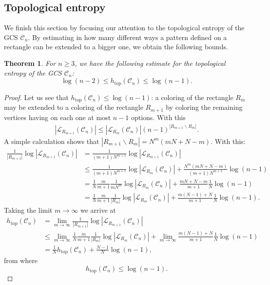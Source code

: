 \documentclass{aims}
\def\htop{h_{\mathrm{top}}}
\newtheorem{theorem}{Theorem}[section]
\theoremstyle{definition}
\begin{document}

\subsection{Topological entropy}
We finish this section by focusing our attention to the topological entropy of the GCS $\mathcal{C}_n$. By estimating in how many different ways a pattern defined on a rectangle can be extended to a bigger one, we obtain the following bounds.
\begin{theorem}\label{thm:gcs_entropy_estimates} For $n\ge 3$, we have the following estimate for the topological entropy of the GCS $\mathcal{C}_n$:
	$$
	\log(n-2)\le \htop(\mathcal{C}_n)\le \log(n-1).
	$$
\end{theorem}
\begin{proof}
	Let us see that $\htop(\mathcal{C}_n)\le \log(n-1)$: a coloring of the rectangle $R_m$ may be extended to a coloring of the rectangle $R_{m+1}$ by coloring the remaining vertices having on each one at most $n-1$ options. With this
	\begin{align*}
	|\mathcal{L}_{R_{m+1}}(\mathcal{C}_n)|\le |\mathcal{L}_{R_m}(\mathcal{C}_{n})|(n-1)^{|R_{m+1}\backslash R_m|}.
	\end{align*}
	A simple calculation shows that $|R_{m+1}\backslash R_{m}|=N^m(mN+N-m)$. 
	With this:
	\begin{align*}
	\frac{1}{|R_{m+1}|}\log|\mathcal{L}_{R_{m+1}}(\mathcal{C}_n)|&=\frac{1}{(m+1)N^{m+1}}\log|\mathcal{L}_{R_{m+1}}(\mathcal{C}_n)|\\
	&\le \frac{1}{(m+1)N^{m+1}}\log|\mathcal{L}_{R_m}(\mathcal{C}_{n})|+\frac{N^m(mN+N-m)}{(m+1)N^{m+1}}\log(n-1)\\
	&=\frac{1}{N}\frac{m}{m+1}\frac{1}{mN^{m}}\log|\mathcal{L}_{R_m}(\mathcal{C}_{n})|+ \frac{mN+N-m}{m+1}\frac{1}{N}\log(n-1)\\
	&=\frac{1}{N}\frac{m}{m+1}\frac{1}{|R_m|}\log|\mathcal{L}_{R_m}(\mathcal{C}_{n})|+ \frac{m(N-1)+N}{m+1}\frac{1}{N}\log(n-1).
	\end{align*}
	Taking the limit $m\to \infty$ we arrive at
	\begin{align*}
	\htop(\mathcal{C}_n)&=\lim_{m\to \infty }	\frac{1}{|R_{m+1}|}\log|\mathcal{L}_{R_{m+1}}(\mathcal{C}_n)|\\
	&\le \lim_{m\to \infty }\frac{1}{N}\frac{m}{m+1}\frac{1}{|R_m|}\log|\mathcal{L}_{R_m}(\mathcal{C}_{n})| +\lim_{m\to \infty }\frac{m(N-1)+N}{m+1}\frac{1}{N}\log(n-1)\\
	&= \frac{1}{N}\htop(\mathcal{C}_n)+\frac{N-1}{N}\log(n-1),
	\end{align*}
	from where 
	$$\htop(\mathcal{C}_n)\le \log(n-1).$$
	

\end{proof}
\end{document}

